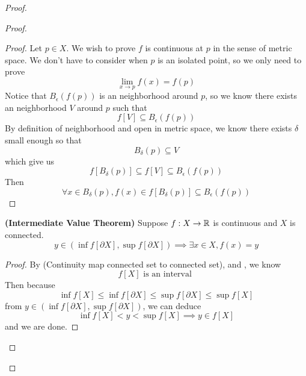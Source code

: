 \documentclass{report}
\begin{document}
\begin{proof}
\begin{proof}
\begin{proof}
Let $p\in  X$. We wish to prove $f$ is continuous at $p$ in the sense of metric space. We don't have to consider when $p$ is an isolated point, so we only need to prove
\begin{equation*}
\lim_{x\to p}f(x)=f(p)
\end{equation*}
Notice that $B_{\epsilon }(f(p))$ is an neighborhood around $p$, so we know there exists an neighborhood $V$ around $p$ such that 
\begin{equation*}
f[V]\subseteq B_{\epsilon }(f(p))
\end{equation*}
By definition of neighborhood and open in metric space, we know there exists $\delta$ small enough so that 
\begin{equation*}
B_{\delta}(p)\subseteq V
\end{equation*}
which give us
\begin{equation*}
f[B_{\delta}(p)]\subseteq f[V]\subseteq B_{\epsilon }(f(p))
\end{equation*}
Then 
\begin{equation*}
\forall x\in B_{\delta}(p), f(x)\in f[B_{\delta}(p)]\subseteq B_{\epsilon }(f(p))
\end{equation*}
\end{proof}
\begin{theorem}
\label{3.11.9}
\textbf{(Intermediate Value Theorem)} Suppose $f:X\rightarrow \mathbb{R}$ is continuous and $X$ is connected. 
\begin{equation*}
y\in (\inf f[\partial X],\sup f[\partial X])\implies \exists x\in X, f(x)=y
\end{equation*}
\end{theorem}
\begin{proof}
By  (Continuity map connected set to connected set), and , we know 
\begin{equation*}
f[X]\text{ is an interval }
\end{equation*}
Then because 
\begin{equation*}
\inf f[X] \leq \inf f[\partial  X]\leq \sup f[\partial X]\leq \sup f[X]
\end{equation*}
from $y\in (\inf f[\partial X],\sup f[\partial X])$, we can deduce
\begin{equation*}
 \inf f[X]<y<\sup f[X]\implies y \in f[X]
\end{equation*}
and we are done.

\end{proof}
\end{proof}
\end{proof}
\end{document}
